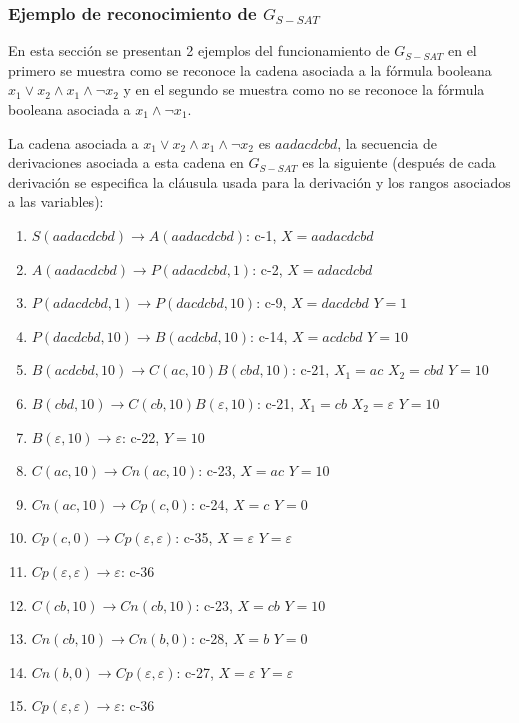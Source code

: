 \documentclass[12pt]{article}
\begin{document}
\subsubsection{Ejemplo de reconocimiento de $G_{S-SAT}$}

En esta sección se presentan 2 ejemplos del funcionamiento de $G_{S-SAT}$ en el primero se muestra como se reconoce
la cadena asociada a la fórmula booleana $x_1 \vee  x_2 \wedge x_1 \wedge \neg x_2$ y en el segundo se muestra como no
se reconoce la fórmula booleana asociada a $x_1 \wedge \neg x_1$.

La cadena asociada a $x_1 \vee  x_2 \wedge x_1 \wedge \neg x_2$ es $aadacdcbd$, la secuencia de derivaciones asociada
a esta cadena en $G_{S-SAT}$ es la siguiente  (después de
cada derivación se especifica la cláusula usada para la derivación y los rangos
asociados a las variables):

\begin{enumerate}
    \item $S(aadacdcbd)\to A(aadacdcbd)$: c-1, $X=aadacdcbd$
    \item $A(aadacdcbd)\to P(adacdcbd,1)$: c-2, $X=adacdcbd$
    \item $P(adacdcbd,1)\to P(dacdcbd,10)$: c-9, $X=dacdcbd$ $Y=1$
    \item $P(dacdcbd,10)\to B(acdcbd, 10)$: c-14, $X=acdcbd$ $Y=10$
    \item $B(acdcbd, 10)\to C(ac,10) B(cbd,10)$: c-21, $X_1=ac$ $X_2=cbd$ $Y=10$
    \item $B(cbd,10)\to C(cb,10) B(\varepsilon,10)$: c-21, $X_1=cb$ $X_2=\varepsilon$ $Y=10$
    \item $B(\varepsilon,10)\to \varepsilon$: c-22, $Y=10$
    \item $C(ac,10)\to Cn(ac,10)$: c-23, $X=ac$ $Y=10$
    \item $Cn(ac,10)\to Cp(c,0)$: c-24, $X=c$ $Y=0$
    \item $Cp(c,0)\to Cp(\varepsilon,\varepsilon)$: c-35, $X=\varepsilon$ $Y=\varepsilon$
    \item $Cp(\varepsilon, \varepsilon) \to \varepsilon$: c-36
    \item $C(cb,10)\to Cn(cb,10)$: c-23, $X=cb$ $Y=10$
    \item $Cn(cb,10)\to Cn(b,0)$: c-28, $X=b$ $Y=0$
    \item $Cn(b,0)\to Cp(\varepsilon,\varepsilon)$: c-27, $X=\varepsilon$ $Y=\varepsilon$
    \item $Cp(\varepsilon, \varepsilon) \to \varepsilon$: c-36
\end{enumerate}
\end{document}
